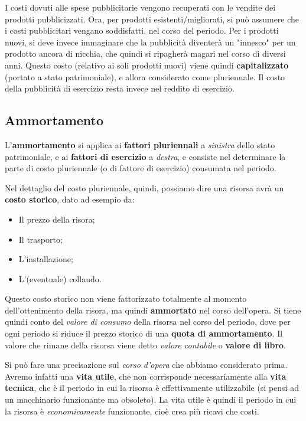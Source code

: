 \documentclass[a4paper,11pt]{article}
\begin{document}
I costi dovuti alle spese pubblicitarie vengono recuperati con le vendite dei prodotti pubblicizzati.
Ora, per prodotti esistenti/migliorati, si può assumere che i costi pubblicitari vengano soddisfatti, nel corso del periodo.
Per i prodotti nuovi, si deve invece immaginare che la pubblicità diventerà un "innesco" per un prodotto ancora di nicchia, che quindi si ripagherà magari nel corso di diversi anni.
Questo costo (relativo ai soli prodotti nuovi) viene quindi \textbf{capitalizzato} (portato a stato patrimoniale), e allora considerato come pluriennale.
Il costo della pubblicità di esercizio resta invece nel reddito di esercizio.

\subsection{Ammortamento}
L'\textbf{ammortamento} si applica ai \textbf{fattori pluriennali} a \textit{sinistra} dello stato patrimoniale, e ai \textbf{fattori di esercizio} a \textit{destra}, e consiste nel determinare la parte di costo pluriennale (o di fattore di esercizio) consumata nel periodo.

Nel dettaglio del costo pluriennale, quindi, possiamo dire una risorsa avrà un \textbf{costo storico}, dato ad esempio da:
\begin{itemize}
	\item Il prezzo della risora;
	\item Il trasporto;
	\item L'installazione;
	\item L'(eventuale) collaudo.
\end{itemize}

Questo costo storico non viene fattorizzato totalmente al momento dell'ottenimento della risora, ma quindi \textbf{ammortato} nel corso dell'opera.
Si tiene quindi conto del \textit{valore di consumo} della risorsa nel corso del periodo, dove per ogni periodo si riduce il prezzo storico di una \textbf{quota di ammortamento}.
Il valore che rimane della risorsa viene detto \textit{valore contabile} o \textbf{valore di libro}.

Si può fare una precisazione sul \textit{corso d'opera} che abbiamo considerato prima.
Avremo infatti una \textbf{vita utile}, che non corrisponde necessariamente alla \textbf{vita tecnica}, che è il periodo in cui la risorsa è effettivamente utilizzabile (si pensi ad un macchinario funzionante ma obsoleto).
La vita utile è quindi il periodo in cui la risorsa è \textit{economicamente} funzionante, cioè crea più ricavi che costi.
\end{document}
